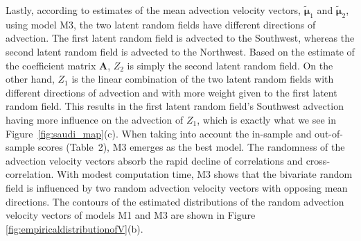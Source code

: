 \documentclass[12pt]{article}
\newcommand{\0}{\mathbf{0}}
\begin{document}
\begin{table*}[t!] %
\centering
{}
\end{table*}

Lastly, according to estimates of the mean advection velocity vectors, $\tilde{\boldsymbol{\mu}}_1$ and $\tilde{\boldsymbol{\mu}}_2$, using model M3, the two latent random fields have different directions of advection. The first latent random field is advected to the Southwest, whereas the second latent random field is advected to the Northwest. Based on the estimate of the coefficient matrix $\mathbf{A}$, $Z_2$ is simply the second latent random field. On the other hand, $Z_1$ is the linear combination of the two latent random fields with different directions of advection and with more weight given to the first latent random field. This results in the first latent random field's Southwest advection having more influence on the advection of $Z_1$, which is exactly what we see in Figure~\ref{fig:saudi_map}(c). When taking into account the in-sample and out-of-sample scores (Table~2), M3 emerges as the best model. The randomness of the advection velocity vectors absorb the rapid decline of correlations and cross-correlation. With modest computation time, M3 shows that the bivariate random field is influenced by two random advection velocity vectors with opposing mean directions. The contours of the estimated distributions of the random advection velocity vectors of models M1 and M3 are shown in Figure \ref{fig:empiricaldistributionofV}(b).
%
\end{document}
